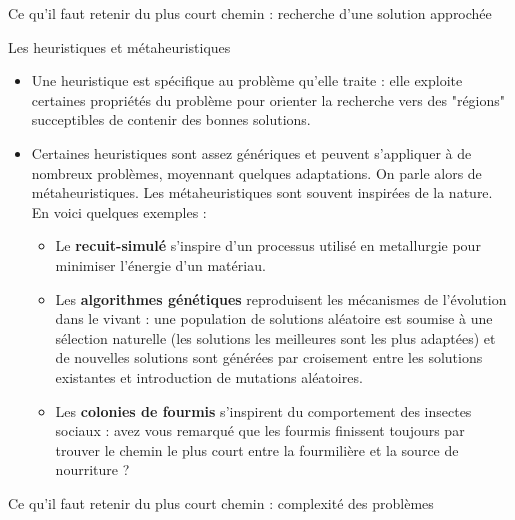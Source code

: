 \begin{frame}{Ce qu'il faut retenir du plus court chemin : recherche d'une solution approchée}
\begin{block}{Les heuristiques et métaheuristiques}
    \begin{itemize}
      \item Une heuristique est spécifique au problème qu'elle traite : elle exploite certaines propriétés du problème pour orienter la recherche vers des "régions" succeptibles de contenir des bonnes solutions.
      \item Certaines heuristiques sont assez génériques et peuvent s'appliquer à de nombreux problèmes, moyennant quelques adaptations. On parle alors de \alert{métaheuristiques}. Les métaheuristiques sont souvent inspirées de la nature. En voici quelques exemples : 
        \begin{itemize}
          \item Le \textbf{recuit-simulé} s'inspire d'un processus utilisé en metallurgie pour minimiser l'énergie d'un matériau.
          \item Les \textbf{algorithmes génétiques} reproduisent les mécanismes de l'évolution dans le vivant : une population de solutions aléatoire est soumise à une sélection naturelle (les solutions les meilleures sont les plus adaptées) et de nouvelles solutions sont générées par croisement entre les solutions existantes et introduction de mutations aléatoires.
          \item Les \textbf{colonies de fourmis} s'inspirent du comportement des insectes sociaux : avez vous remarqué que les fourmis finissent toujours par trouver le chemin le plus court entre la fourmilière et la source de nourriture ?
        \end{itemize}
    \end{itemize}
  \end{block}

\end{frame}

\begin{frame}{Ce qu'il faut retenir du plus court chemin : complexité des problèmes}


\end{frame}
